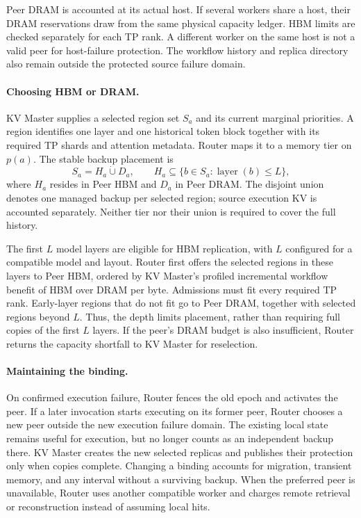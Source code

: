 Peer DRAM is accounted at its actual host. If several workers share a
host, their DRAM reservations draw from the same physical capacity
ledger. HBM limits are checked separately for each TP rank. A different
worker on the same host is not a valid peer for host-failure protection.
The workflow history and replica directory also remain outside the
protected source failure domain.

\paragraph{Choosing HBM or DRAM.}
KV Master supplies a selected region set $S_a$ and its current marginal
priorities. A region identifies one layer and one historical token block
together with its required TP shards and attention metadata. Router
maps it to a memory tier on $p(a)$. The stable backup placement is
\begin{equation}
 S_a=H_a\mathbin{\dot\cup}D_a,\qquad
 H_a\subseteq\{b\in S_a:\operatorname{layer}(b)\le L\},
 \label{eq:teacher-placement}
\end{equation}
where $H_a$ resides in Peer HBM and $D_a$ in Peer DRAM. The disjoint
union denotes one managed backup per selected region; source execution
KV is accounted separately. Neither tier nor their union is required
to cover the full history.

The first $L$ model layers are eligible for HBM replication, with $L$
configured for a compatible model and layout. Router first offers the
selected regions in these layers to Peer HBM, ordered by KV Master's
profiled incremental workflow benefit of HBM over DRAM per byte.
Admissions must fit every required TP rank. Early-layer regions that
do not fit go to Peer DRAM, together with selected regions beyond $L$.
Thus, the depth limits placement, rather than requiring full copies
of the first $L$ layers. If the peer's DRAM budget is also insufficient,
Router returns the capacity shortfall to KV Master for reselection.

\paragraph{Maintaining the binding.}
On confirmed execution failure, Router fences the old epoch and
activates the peer. If a later invocation starts executing on its former
peer, Router chooses a new peer outside the new execution failure
domain. The existing local state remains useful for execution, but no
longer counts as an independent backup there. KV Master creates the
new selected replicas and publishes their protection only when copies
complete. Changing a binding accounts for migration, transient memory,
and any interval without a surviving backup. When the preferred peer
is unavailable, Router uses another compatible worker and charges
remote retrieval or reconstruction instead of assuming local hits.


